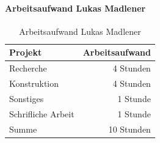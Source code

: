 \paragraph{Arbeitsaufwand Lukas Madlener}

\begin{table}[!h]
  \centering
  \begin{tabular}{lr}
    \toprule
    \textbf{Projekt}   & \textbf{Arbeitsaufwand} \\
    \midrule
    Recherche          & 4 Stunden               \\
    Konstruktion       & 4 Stunden               \\
    Sonstiges          & 1 Stunde                \\
    Schrifliche Arbeit & 1 Stunde                \\
    \midrule
    Summe              & 10 Stunden              \\
    \bottomrule
  \end{tabular}
  \caption{Arbeitsaufwand Lukas Madlener}
  \label{tab:zeiterfassung_lukas_madlener}
\end{table}